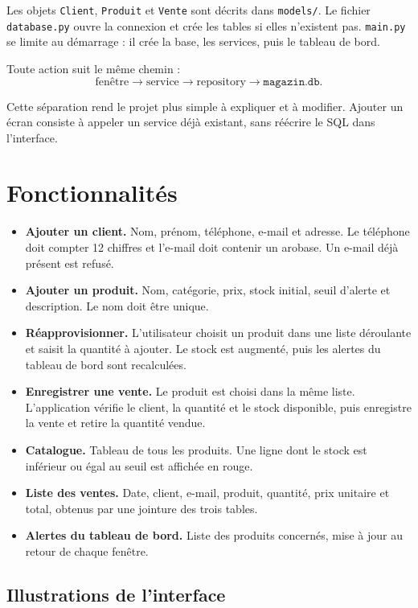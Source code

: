 \documentclass[11pt,a4paper]{article}
\begin{document}
Les objets \texttt{Client}, \texttt{Produit} et \texttt{Vente} sont décrits dans \texttt{models/}. Le fichier \texttt{database.py} ouvre la connexion et crée les tables si elles n'existent pas. \texttt{main.py} se limite au démarrage : il crée la base, les services, puis le tableau de bord.

Toute action suit le même chemin :
\[
\text{fenêtre} \rightarrow \text{service} \rightarrow \text{repository} \rightarrow \texttt{magazin.db}.
\]

Cette séparation rend le projet plus simple à expliquer et à modifier. Ajouter un écran consiste à appeler un service déjà existant, sans réécrire le SQL dans l'interface.

\section{Fonctionnalités}

\begin{itemize}
    \item \textbf{Ajouter un client.} Nom, prénom, téléphone, e-mail et adresse. Le téléphone doit compter 12 chiffres et l'e-mail doit contenir un arobase. Un e-mail déjà présent est refusé.
    \item \textbf{Ajouter un produit.} Nom, catégorie, prix, stock initial, seuil d'alerte et description. Le nom doit être unique.
    \item \textbf{Réapprovisionner.} L'utilisateur choisit un produit dans une liste déroulante et saisit la quantité à ajouter. Le stock est augmenté, puis les alertes du tableau de bord sont recalculées.
    \item \textbf{Enregistrer une vente.} Le produit est choisi dans la même liste. L'application vérifie le client, la quantité et le stock disponible, puis enregistre la vente et retire la quantité vendue.
    \item \textbf{Catalogue.} Tableau de tous les produits. Une ligne dont le stock est inférieur ou égal au seuil est affichée en rouge.
    \item \textbf{Liste des ventes.} Date, client, e-mail, produit, quantité, prix unitaire et total, obtenus par une jointure des trois tables.
    \item \textbf{Alertes du tableau de bord.} Liste des produits concernés, mise à jour au retour de chaque fenêtre.
\end{itemize}

\subsection{Illustrations de l'interface}
\end{document}
